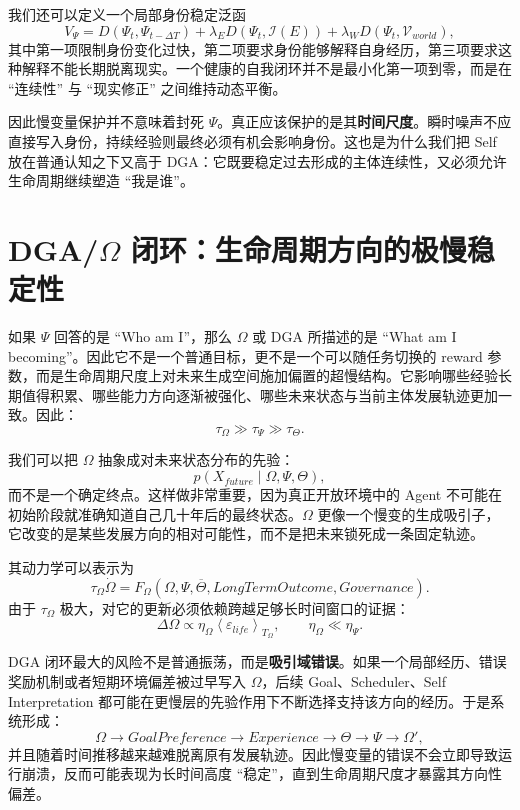我们还可以定义一个局部身份稳定泛函
\[
V_\Psi
=
D(\Psi_t,\Psi_{t-\Delta T})
+
\lambda_E D(\Psi_t,\mathcal I(E))
+
\lambda_W D(\Psi_t,\mathcal V_{world}),
\]
其中第一项限制身份变化过快，第二项要求身份能够解释自身经历，第三项要求这种解释不能长期脱离现实。一个健康的自我闭环并不是最小化第一项到零，而是在 ``连续性'' 与 ``现实修正'' 之间维持动态平衡。

因此慢变量保护并不意味着封死 $\Psi$。真正应该保护的是其\textbf{时间尺度}。瞬时噪声不应直接写入身份，持续经验则最终必须有机会影响身份。这也是为什么我们把 Self 放在普通认知之下又高于 DGA：它既要稳定过去形成的主体连续性，又必须允许生命周期继续塑造 ``我是谁''。

\section{DGA/$\Omega$ 闭环：生命周期方向的极慢稳定性}

如果 $\Psi$ 回答的是 ``Who am I''，那么 $\Omega$ 或 DGA 所描述的是 ``What am I becoming''。因此它不是一个普通目标，更不是一个可以随任务切换的 reward 参数，而是生命周期尺度上对未来生成空间施加偏置的超慢结构。它影响哪些经验长期值得积累、哪些能力方向逐渐被强化、哪些未来状态与当前主体发展轨迹更加一致。因此：
\[
\tau_\Omega
\gg
\tau_\Psi
\gg
\tau_\Theta.
\]

我们可以把 $\Omega$ 抽象成对未来状态分布的先验：
\[
p
\left(
X_{future}\mid\Omega,\Psi,\Theta
\right),
\]
而不是一个确定终点。这样做非常重要，因为真正开放环境中的 Agent 不可能在初始阶段就准确知道自己几十年后的最终状态。$\Omega$ 更像一个慢变的生成吸引子，它改变的是某些发展方向的相对可能性，而不是把未来锁死成一条固定轨迹。

其动力学可以表示为
\[
\tau_\Omega\dot\Omega
=
F_\Omega
\left(
\Omega,
\Psi,
\overline{\Theta},
LongTermOutcome,
Governance
\right).
\]
由于 $\tau_\Omega$ 极大，对它的更新必须依赖跨越足够长时间窗口的证据：
\[
\Delta\Omega
\propto
\eta_\Omega
\left\langle
\varepsilon_{life}
\right\rangle_{T_\Omega},
\qquad
\eta_\Omega
\ll
\eta_\Psi.
\]

DGA 闭环最大的风险不是普通振荡，而是\textbf{吸引域错误}。如果一个局部经历、错误奖励机制或者短期环境偏差被过早写入 $\Omega$，后续 Goal、Scheduler、Self Interpretation 都可能在更慢层的先验作用下不断选择支持该方向的经历。于是系统形成：
\[
\Omega
\rightarrow
GoalPreference
\rightarrow
Experience
\rightarrow
\Theta
\rightarrow
\Psi
\rightarrow
\Omega',
\]
并且随着时间推移越来越难脱离原有发展轨迹。因此慢变量的错误不会立即导致运行崩溃，反而可能表现为长时间高度 ``稳定''，直到生命周期尺度才暴露其方向性偏差。

